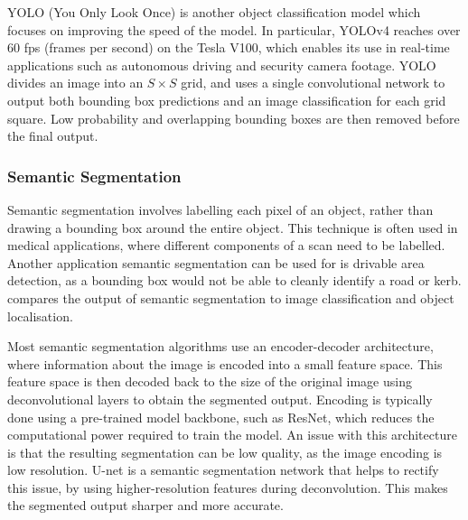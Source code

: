 YOLO (You Only Look Once) \cite{redmonYouOnlyLook2015}\cite{redmonYOLO9000BetterFaster2016}\cite{redmonYOLOv3IncrementalImprovement2018}\cite{bochkovskiyYOLOv4OptimalSpeed2020}
is another object classification model which focuses on improving the speed of the model. In particular, YOLOv4 \cite{bochkovskiyYOLOv4OptimalSpeed2020}
reaches over 60 fps (frames per second) on the Tesla V100, which enables its use in real-time applications such as autonomous driving and security camera footage. %
YOLO divides an image into an $S\times S$ grid, and uses a single convolutional network to output both bounding box predictions and
an image classification for each grid square. Low probability and overlapping bounding boxes are then removed before the final output.

\subsubsection{Semantic Segmentation}
Semantic segmentation involves labelling each pixel of an object, rather than drawing a bounding box around the entire object.
This technique is often used in medical applications, where different components of a scan need to be labelled.
Another application semantic segmentation can be used for is drivable area detection, as a bounding box would not be able to cleanly
identify a road or kerb.  compares the output of semantic segmentation to image classification and object localisation.

Most semantic segmentation algorithms use an encoder-decoder architecture, where information about the image is encoded into a small feature space.
This feature space is then decoded back to the size of the original image using deconvolutional layers to obtain the segmented output.
Encoding is typically done using a pre-trained model backbone, such as ResNet, which reduces the computational power required to train
the model.
An issue with this architecture is that the resulting segmentation can be low quality, as the image encoding is low resolution.
U-net \cite{ronnebergerUNetConvolutionalNetworks2015} is a semantic segmentation network that helps to rectify this issue,
by using higher-resolution features during deconvolution.
This makes the segmented output sharper and more accurate.

